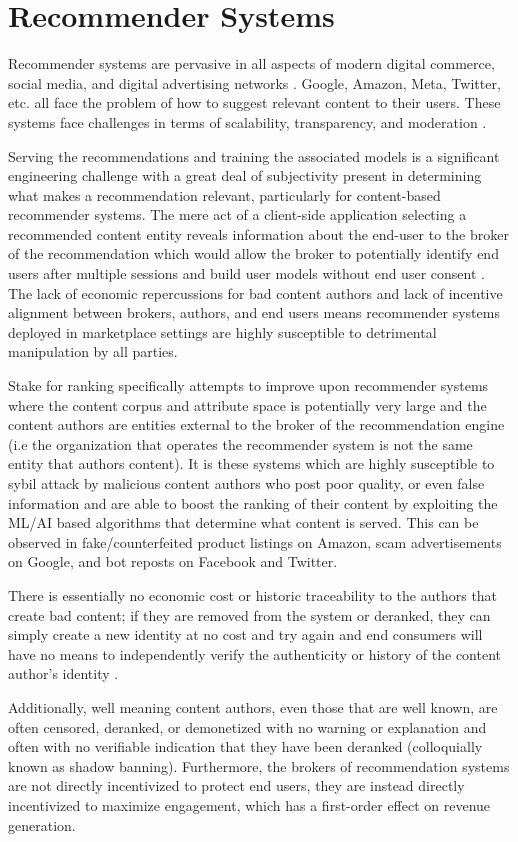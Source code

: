 \section{Recommender Systems}


Recommender systems are pervasive in all aspects of modern digital commerce, social media, and digital advertising networks \cite{resnick1997recommender} \cite{lops2011content} \cite{gomez2015netflix}. Google, Amazon, Meta, Twitter, etc. all face the problem of how to suggest relevant content to their users. These systems face challenges in terms of scalability, transparency, and moderation \cite{wang2022trustworthy}. 

Serving the recommendations and training the associated models is a significant engineering challenge with a great deal of subjectivity present in determining what makes a recommendation relevant, particularly for content-based recommender systems. The mere act of a client-side application selecting a recommended content entity reveals information about the end-user to the broker of the recommendation which would allow the broker to potentially identify end users after multiple sessions and build user models without end user consent \cite{boutet2018collaborative}. The lack of economic repercussions for bad content authors and lack of incentive alignment between brokers, authors, and end users means recommender systems deployed in marketplace settings are highly susceptible to detrimental manipulation by all parties.

Stake for ranking specifically attempts to improve upon recommender systems where the content corpus and attribute space is potentially very large and the content authors are entities external to the broker of the recommendation engine (i.e the organization that operates the recommender system is not the same entity that authors content). It is these systems which are highly susceptible to sybil attack by malicious content authors who post poor quality, or even false information and are able to boost the ranking of their content by exploiting the ML/AI based algorithms that determine what content is served. This can be observed in fake/counterfeited product listings on Amazon, scam advertisements on Google, and bot reposts on Facebook and Twitter. 

There is essentially no economic cost or historic traceability to the authors that create bad content; if they are removed from the system or deranked, they can simply create a new identity at no cost and try again and end consumers will have no means to independently verify the authenticity or history of the content author's identity \cite{lin2022shilling}. 

Additionally, well meaning content authors, even those that are well known, are often censored, deranked, or demonetized with no warning or explanation and often with no verifiable indication that they have been deranked (colloquially known as shadow banning). Furthermore, the brokers of recommendation systems are not directly incentivized to protect end users, they are instead directly incentivized to maximize engagement, which has a first-order effect on revenue generation. 
